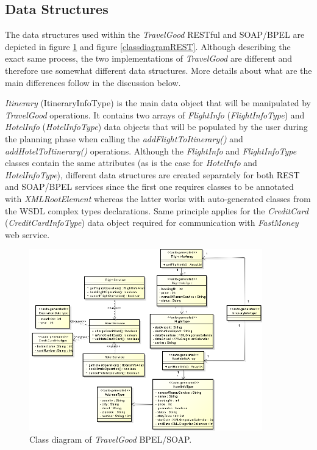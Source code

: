 \subsection{Data Structures}
The data structures used within the \textit{TravelGood} RESTful and SOAP/BPEL are depicted in figure \ref{classdiagramBPEL} and figure \ref{classdiagramREST}. Although describing the exact same process, the two implementations of \textit{TravelGood} are different and therefore use somewhat different data structures. More details about what are the main differences follow in the discussion below. 

\textit{Itinerary} (ItineraryInfoType) is the main data object that will be manipulated by \textit{TravelGood} operations. It contains two arrays of \textit{FlightInfo} (\textit{FlightInfoType}) and \textit{HotelInfo} (\textit{HotelInfoType}) data objects that will be populated by the user during the planning phase when calling the \textit{addFlightToItinerary()} and \textit{addHotelToItinerary()} operations. Although the \textit{FlightInfo} and \textit{FlightInfoType} classes contain the same attributes (as is the case for \textit{HotelInfo} and \textit{HotelInfoType}), different data structures are created separately for both REST and SOAP/BPEL services since the first one requires classes to be annotated with \textit{\@ XMLRootElement} whereas the latter works with auto-generated classes from the WSDL complex types declarations. Same principle applies for the \textit{CreditCard} (\textit{CreditCardInfoType}) data object required for communication with \textit{FastMoney} web service.

\begin{figure}[H]
\centering
\includegraphics[width=0.9\textwidth]{images/BPEL-SOAP}
\caption{Class diagram of \textit{TravelGood} BPEL/SOAP.}
\label{classdiagramBPEL}
\end{figure}

